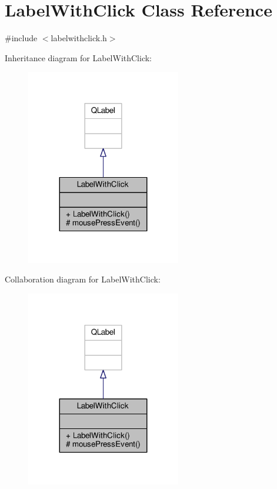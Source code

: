 \hypertarget{classLabelWithClick}{}\section{Label\+With\+Click Class Reference}
\label{classLabelWithClick}


{\ttfamily \#include $<$labelwithclick.\+h$>$}



Inheritance diagram for Label\+With\+Click\+:
\nopagebreak
\begin{figure}[H]
\begin{center}
\leavevmode
\includegraphics[width=191pt]{classLabelWithClick__inherit__graph}
\end{center}
\end{figure}


Collaboration diagram for Label\+With\+Click\+:
\nopagebreak
\begin{figure}[H]
\begin{center}
\leavevmode
\includegraphics[width=191pt]{classLabelWithClick__coll__graph}
\end{center}
\end{figure}
